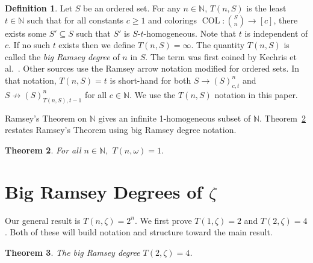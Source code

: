 \documentclass[10pt,a4paper]{article}
\newcommand{\oequiv}{\approx}
\newcommand{\COL}{\operatorname{COL}}
\newcommand{\N}{\mathbb{N}}
\newcommand{\numpoints}{n}
\newcommand{\numcolors}{c}
\theoremstyle{plain}
\newtheorem{theorem}{Theorem}[section]
\theoremstyle{definition}
\newtheorem{definition}[theorem]{Definition}
\begin{document}
\begin{definition}\label{def:T}
Let $S$ be an ordered set.
For any $\numpoints\in \N$, $T(\numpoints,S)$
is the least $t\in \N$ such that for all constants $\numcolors \geq 1$ and
colorings  $\COL \colon \binom{S}{\numpoints} \to [\numcolors]$, there exists some $S' \subseteq S$ 
such that $S'$ is $S$-$t$-homogeneous.
Note that $t$ is independent of $\numcolors$.
If no such $t$ exists then we define $T(\numpoints,S)=\infty$. 
The quantity $T(\numpoints,S)$ is called the \textit{big Ramsey degree} of $\numpoints$ in $S$.
The term was first coined by Kechris et al.~\cite{KPT-2005}. Other sources use the Ramsey arrow notation modified for ordered sets. In that notation, $T(\numpoints,S)=t$ is short-hand for both
$S \to (S)^{\numpoints}_{\numcolors,t}$ and $S \not \to
(S)^{\numpoints}_{T(\numpoints,S),t-1}$ for all $\numcolors \in \N.$
We use the $T(n, S)$ notation in this paper.
\end{definition}

Ramsey's Theorem on $\N$ gives an infinite 1-homogeneous subset of $\N$. Theorem~\ref{th:ramsey} restates Ramsey's Theorem using big Ramsey degree notation.

\begin{theorem}\label{th:ramsey}
For all $\numpoints \in \N,$
$T(\numpoints,\omega)=1.$
\end{theorem}

\section{Big Ramsey Degrees of \texorpdfstring{$\zeta$}{Z}}\label{se:Z}


Our general result is $T(n, \zeta) = 2^n$.
We first prove $T(1,\zeta)=2$
and $T(2,\zeta)=4$. Both of these will 
build notation and structure toward the main result.

\begin{theorem}\label{the:Z2}
The big Ramsey degree $T(2,\zeta)=4$. 
\end{theorem}
\end{document}
